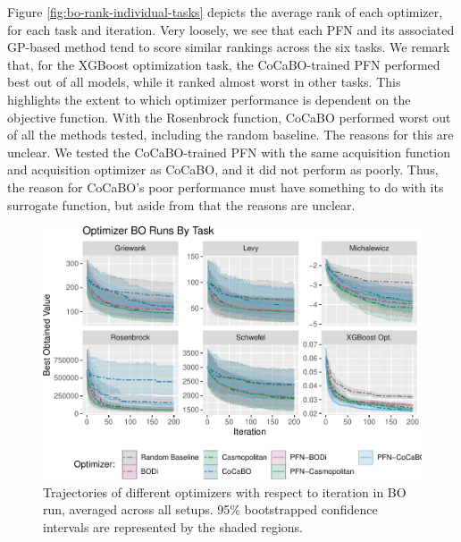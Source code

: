 \documentclass[12pt,twoside]{reedthesis}
\begin{document}
Figure \ref{fig:bo-rank-individual-tasks} depicts the average rank of each optimizer, for each task and iteration. Very loosely, we see that each PFN and its associated GP-based method tend to score similar rankings across the six tasks. We remark that, for the XGBoost optimization task, the CoCaBO-trained PFN performed best out of all models, while it ranked almost worst in other tasks. This highlights the extent to which optimizer performance is dependent on the objective function. With the Rosenbrock function, CoCaBO performed worst out of all the methods tested, including the random baseline. The reasons for this are unclear. We tested the CoCaBO-trained PFN with the same acquisition function and acquisition optimizer as CoCaBO, and it did not perform as poorly. Thus, the reason for CoCaBO's poor performance must have something to do with its surrogate function, but aside from that the reasons are unclear.
\begin{figure}
\centering
\includegraphics{thesis_files/figure-latex/bo-trajectory-1.pdf}
\caption{\label{fig:bo-trajectory}Trajectories of different optimizers with respect to iteration in BO run, averaged across all setups. 95\% bootstrapped confidence intervals are represented by the shaded regions.}
\end{figure}
\end{document}
